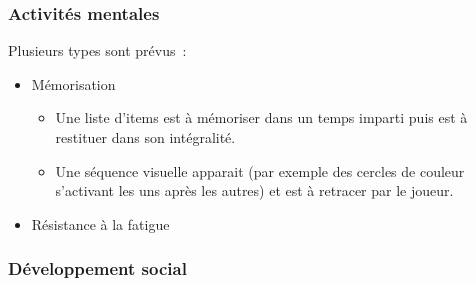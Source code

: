 \documentclass[a4paper,12pt,francais]{article}
\begin{document}
\subsubsection{Activités mentales}
Plusieurs types sont prévus~:
\begin{itemize}
    \item Mémorisation
        \begin{itemize}
            \item Une liste d’items est à mémoriser dans un temps imparti puis est à restituer dans son intégralité.
            \item Une séquence visuelle apparait (par exemple des cercles de couleur s'activant les uns après les autres) et est à retracer par le joueur.
        \end{itemize}
    \item Résistance à la fatigue
\end{itemize}

\subsubsection{Développement social}
\end{document}
